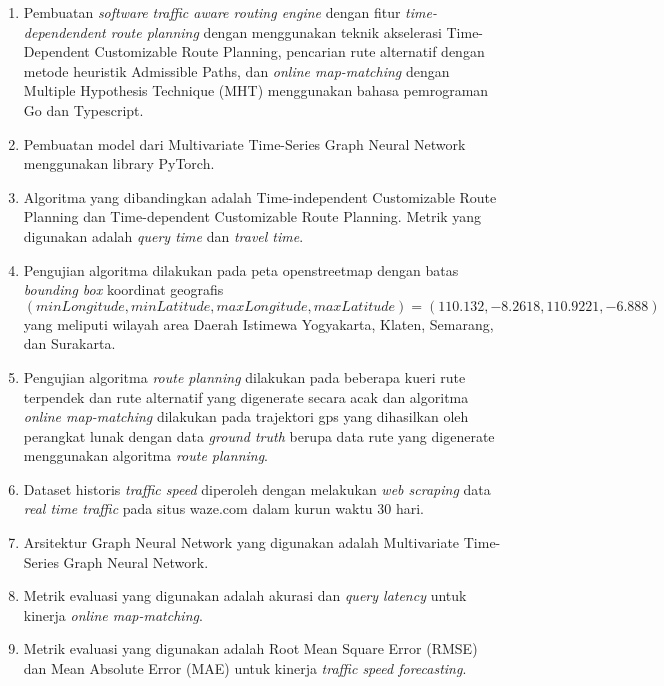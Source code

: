 \begin{enumerate}
    \item Pembuatan \textit{software} \textit{traffic aware routing engine} dengan fitur \textit{time-dependendent route planning} dengan menggunakan teknik akselerasi Time-Dependent Customizable Route Planning, pencarian rute alternatif dengan metode heuristik Admissible Paths, dan \textit{online map-matching } dengan Multiple Hypothesis Technique (MHT) menggunakan bahasa pemrograman Go dan Typescript.
    \item Pembuatan model dari Multivariate Time-Series Graph Neural Network menggunakan library PyTorch.
    \item Algoritma yang dibandingkan adalah Time-independent Customizable Route Planning dan Time-dependent Customizable Route Planning. Metrik yang digunakan adalah \textit{query time} dan \textit{travel time}.
    \item Pengujian algoritma dilakukan pada peta openstreetmap dengan batas \textit{bounding box} koordinat geografis $(minLongitude,minLatitude,maxLongitude,maxLatitude)=(110.132,-8.2618,110.9221,-6.888)$ yang meliputi wilayah area Daerah Istimewa Yogyakarta, Klaten, Semarang, dan Surakarta. 
    \item Pengujian algoritma \textit{route planning} dilakukan pada beberapa kueri rute terpendek dan rute alternatif yang digenerate secara acak dan algoritma \textit{online map-matching} dilakukan pada trajektori gps yang dihasilkan oleh perangkat lunak dengan data \textit{ground truth} berupa data rute yang digenerate menggunakan algoritma \textit{route planning}.
  
    \item Dataset historis \textit{traffic speed} diperoleh dengan melakukan \textit{web scraping} data \textit{real time traffic} pada situs waze.com dalam kurun waktu 30 hari.
    \item Arsitektur Graph Neural Network yang digunakan adalah Multivariate Time-Series Graph Neural Network.
    \item Metrik evaluasi yang digunakan adalah akurasi dan \textit{query latency} untuk kinerja \textit{online map-matching}.
    \item Metrik evaluasi yang digunakan adalah Root Mean Square Error (RMSE) dan Mean Absolute Error (MAE) untuk kinerja \textit{traffic speed forecasting}.
\end{enumerate}